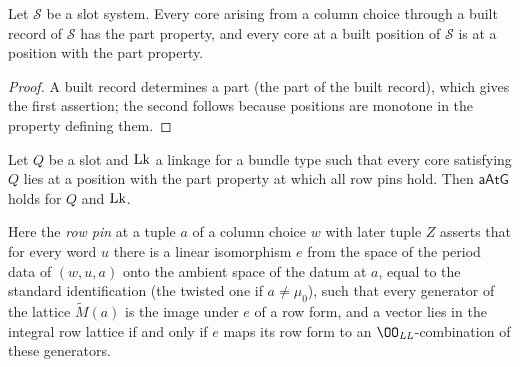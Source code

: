 \begin{lemma}\label{pf:rows:haspart}
Let $\mathcal S$ be a slot system. Every core arising from a column choice through a built record of $\mathcal S$ has the
part property, and every core at a built position of $\mathcal S$ is at a position with the part property.
\end{lemma}

\begin{proof}
A built record determines a part (the part of the built record), which gives the first assertion; the second follows
because positions are monotone in the property defining them.
\end{proof}

\begin{proposition}\label{pf:rows:atgpin}
Let $Q$ be a slot and $\mathrm{Lk}$ a linkage for a bundle type such that every core satisfying $Q$ lies at a position with the part
property at which all row pins hold. Then $\mathsf{aAtG}$ holds for $Q$ and $\mathrm{Lk}$.
\end{proposition}

Here the \emph{row pin} at a tuple $a$ of a column choice $w$ with later tuple $Z$ asserts that for every word $u$ there is a linear
isomorphism $e$ from the space of the period data of $(w,u,a)$ onto the ambient space of the datum at $a$, equal to the standard
identification (the twisted one if $a\ne\mu_0$), such that every generator of the lattice $\widetilde M(a)$ is the image under $e$
of a row form, and a vector lies in the integral row lattice if and only if $e$ maps its row form to an
$\OO_{\mathit{LL}}$-combination of these generators.

